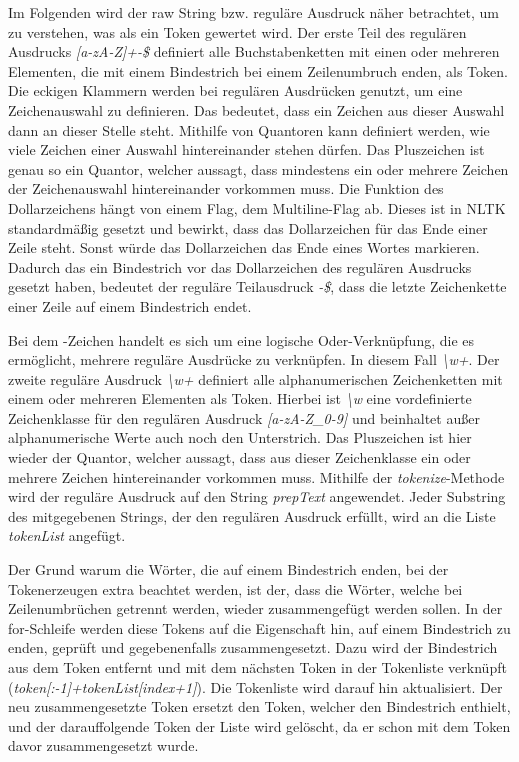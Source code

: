 Im Folgenden wird der raw String bzw. reguläre Ausdruck näher betrachtet, um zu verstehen, was als ein Token gewertet wird. Der erste Teil des regulären Ausdrucks \textit{[a-zA-Z]+-\$} definiert alle Buchstabenketten mit einen oder mehreren Elementen, die mit einem Bindestrich bei einem Zeilenumbruch enden, als Token. Die eckigen Klammern werden bei regulären Ausdrücken genutzt, um eine Zeichenauswahl zu definieren. Das bedeutet, dass ein Zeichen aus dieser Auswahl dann an dieser Stelle steht. Mithilfe von Quantoren kann definiert werden, wie viele Zeichen einer Auswahl hintereinander stehen dürfen. Das Pluszeichen ist genau so ein Quantor, welcher aussagt, dass mindestens ein oder mehrere Zeichen der Zeichenauswahl hintereinander vorkommen muss. Die Funktion des Dollarzeichens hängt von einem Flag, dem Multiline-Flag ab. Dieses ist in NLTK standardmäßig gesetzt und bewirkt, dass das Dollarzeichen für das Ende einer Zeile steht.\cite{nltk} Sonst würde das Dollarzeichen das Ende eines Wortes markieren. Dadurch das ein Bindestrich vor das Dollarzeichen des regulären Ausdrucks gesetzt haben, bedeutet der reguläre Teilausdruck \textit{-\$}, dass die letzte Zeichenkette einer Zeile auf einem Bindestrich endet.

Bei dem \textbar{}-Zeichen handelt es sich um eine logische Oder-Verknüpfung, die es ermöglicht, mehrere reguläre Ausdrücke zu verknüpfen. In diesem Fall \textit{\textbackslash w+}. Der zweite reguläre Ausdruck \textit{\textbackslash w+} definiert alle alphanumerischen Zeichenketten mit einem oder mehreren Elementen als Token. Hierbei ist \textit{\textbackslash w} eine vordefinierte Zeichenklasse für den regulären Ausdruck \textit{[a-zA-Z\_0-9]} und beinhaltet außer alphanumerische Werte auch noch den Unterstrich. Das Pluszeichen ist hier wieder der Quantor, welcher aussagt, dass aus dieser Zeichenklasse ein oder mehrere Zeichen hintereinander vorkommen muss. Mithilfe der \textit{tokenize}-Methode wird der reguläre Ausdruck auf den String \textit{prepText} angewendet. Jeder Substring des mitgegebenen Strings, der den regulären Ausdruck erfüllt, wird an die Liste \textit{tokenList} angefügt.

Der Grund warum die Wörter, die auf einem Bindestrich enden, bei der Tokenerzeugen extra beachtet werden, ist der, dass die Wörter, welche bei Zeilenumbrüchen getrennt werden, wieder zusammengefügt werden sollen. In der for-Schleife werden diese Tokens auf die Eigenschaft hin, auf einem Bindestrich zu enden, geprüft und gegebenenfalls zusammengesetzt. Dazu wird der Bindestrich aus dem Token entfernt und mit dem nächsten Token in der Tokenliste verknüpft (\textit{token[:-1]+tokenList[index+1]}). Die Tokenliste wird darauf hin aktualisiert. Der neu zusammengesetzte Token ersetzt den Token, welcher den Bindestrich enthielt, und der darauffolgende Token der Liste wird gelöscht, da er schon mit dem Token davor zusammengesetzt wurde.

